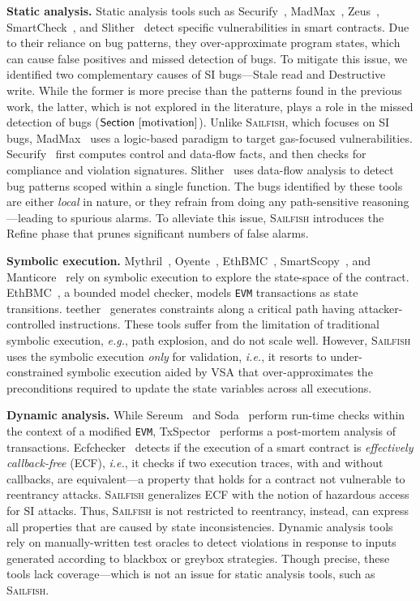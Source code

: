 \documentclass[conference, romanappendices]{tex/IEEEtran}
\theoremstyle{bfnote}
\newcommand{\toolname}{\textsc{Sailfish}\xspace}
\newcommand{\oyente}{{\sc Oyente}\xspace}
\newcommand{\teether}{{\sc teether}\xspace}
\newcommand{\refine}{{\sc Refine}\xspace}
\newcommand{\securify}{{\sc Securify}\xspace}
\newcommand{\sereum}{{\sc Sereum}\xspace}
\newcommand{\slither}{{\sc Slither}\xspace}
\newcommand{\madmax}{{\sc MadMax}\xspace}
\newcommand{\zeus}{{\sc Zeus}\xspace}
\newcommand{\manticore}{{\sc Manticore}\xspace}
\newcommand{\ethbmc}{{\sc EthBMC}\xspace}
\newcommand{\smartscopy}{{\sc SmartScopy}\xspace}
\newcommand{\smartcheck}{{\sc SmartCheck}\xspace}
\newcommand{\ecf}{{\sc Ecfchecker}\xspace}
\newcommand{\soda}{{\sc Soda}\xspace}
\newcommand{\txspector}{{\sc TxSpector}\xspace}
\newcommand{\smart}{smart contract}
\newcommand{\reentrancy}{{reentrancy}\xspace}
\newcommand{\haz}{{hazardous access}\xspace}
\newcommand{\mythril}{{\sc Mythril}\xspace}
\newcommand{\eg}{\textit{e.g.}}
\newcommand{\ie}{\textit{i.e.}}
\newcommand{\Sect}[1]{\ensuremath{\sf Section~\ref{#1}}}
\begin{document}
\noindent
\textbf{Static analysis.}
Static analysis tools such as \securify~\cite{securify}, \madmax~\cite{madmax}, \zeus~\cite{zeus}, \smartcheck~\cite{smartcheck}, and \slither~\cite{slither} detect specific vulnerabilities in smart contracts.
Due to their reliance on bug patterns, they over-approximate program states, which can cause false positives and missed detection of bugs.
To mitigate this issue, we identified two complementary causes of SI bugs---Stale read and Destructive write.
While the former is more precise than the patterns found in the previous work, the latter, which is not explored in the literature, plays a role in the missed detection of bugs (\Sect{motivation}).
Unlike \toolname, which focuses on SI bugs, \madmax~\cite{madmax} uses a logic-based paradigm to target gas-focused vulnerabilities.
\securify~\cite{securify} first computes control and data-flow facts, and then checks for compliance and violation signatures.
\slither~\cite{slither} uses data-flow analysis to detect bug patterns scoped within a single function.
The bugs identified by these tools are either \textit{local} in nature, or they refrain from doing any path-sensitive reasoning---leading to spurious alarms.
To alleviate this issue, \toolname introduces the \refine{} phase that prunes significant numbers of false alarms.


\noindent
\textbf{Symbolic execution.}
\mythril~\cite{mythril}, \oyente~\cite{oyente}, \ethbmc~\cite{ethbmc}, \smartscopy~\cite{smartscopy}, and \manticore~\cite{manticore} rely on symbolic execution to explore the state-space of the contract.
\ethbmc~\cite{ethbmc}, a bounded model checker, models \texttt{EVM} transactions as state transitions.
\teether~\cite{teether} generates constraints along a critical path having attacker-controlled instructions.
These tools suffer from the limitation of traditional symbolic execution, \eg, path explosion, and do not scale well.
However, \toolname{} uses the symbolic execution \textit{only} for validation, \ie, 
it resorts to under-constrained symbolic execution aided by VSA that over-approximates the preconditions required to update the state variables 
across all executions.


\noindent
\textbf{Dynamic analysis.}
While \sereum~\cite{sereum} and \soda~\cite{soda} perform run-time checks within the context of a modified \texttt{EVM}, \txspector~\cite{txspector} performs a post-mortem analysis of transactions.
\ecf~\cite{ecf} detects if the execution of a \smart{} is \textit{effectively callback-free} (ECF), \ie, it checks if two execution traces, with and without callbacks, are equivalent---a property that holds for a contract not vulnerable to \reentrancy attacks.
\toolname generalizes ECF with the notion of \haz for SI attacks.
Thus, \toolname is not restricted to \reentrancy, instead, can express all properties that are caused by state inconsistencies.
Dynamic analysis tools~\cite{contractfuzzer, harvey, bran, echidna, sfuzz}
rely on manually-written test oracles to detect violations in response to inputs generated according to blackbox or greybox strategies.
Though precise, these tools lack coverage---which is not an issue for static analysis tools, such as \toolname.
\end{document}
